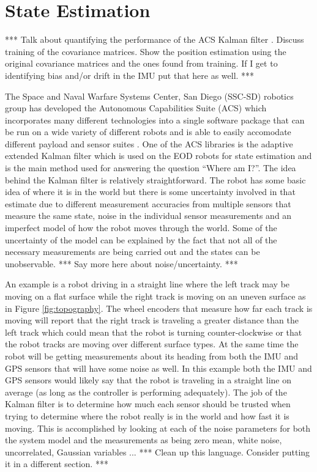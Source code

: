 \chapter{State Estimation}
\label{ch:estimation}
*** Talk about quantifying the performance of the ACS Kalman filter \cite{Sights06}. Discuss training of the covariance matrices. Show the position estimation using the original covariance matrices and the ones found from training. If I get to identifying bias and/or drift in the IMU put that here as well. ***

The Space and Naval Warfare Systems Center, San Diego (SSC-SD) robotics group has developed the Autonomous Capabilities Suite (ACS) which incorporates many different technologies into a single software package that can be run on a wide variety of different robots and is able to easily accomodate different payload and sensor suites \cite{Sights06}. One of the ACS libraries is the adaptive extended Kalman filter which is used on the EOD robots for state estimation and is the main method used for answering the question ``Where am I?''. The idea behind the Kalman filter is relatively straightforward. The robot has some basic idea of where it is in the world but there is some uncertainty involved in that estimate due to different measurement accuracies from multiple sensors that measure the same state, noise in the individual sensor measurements and an imperfect model of how the robot moves through the world. Some of the uncertainty of the model can be explained by the fact that not all of the necessary measurements are being carried out and the states can be unobservable. *** Say more here about noise/uncertainty. ***

An example is a robot driving in a straight line where the left track may be moving on a flat surface while the right track is moving on an uneven surface as in Figure \ref{fig:topography}. The wheel encoders that measure how far each track is moving will report that the right track is traveling a greater distance than the left track which could mean that the robot is turning counter-clockwise or that the robot tracks are moving over different surface types. At the same time the robot will be getting measurements about its heading from both the IMU and GPS sensors that will have some noise as well. In this example both the IMU and GPS sensors would likely say that the robot is traveling in a straight line on average (as long as the controller is performing adequately). The job of the Kalman filter is to determine how much each sensor should be trusted when trying to determine where the robot really is in the world and how fast it is moving. This is accomplished by looking at each of the noise parameters for both the system model and the measurements as being zero mean, white noise, uncorrelated, Gaussian variables ... *** Clean up this language. Consider putting it in a different section. ***

